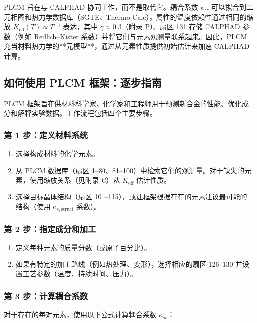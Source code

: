 \documentclass[12pt,a4paper]{article}
\newcommand{\Keff}{K_{\mathrm{eff}}}
\begin{document}
	PLCM 旨在与 CALPHAD 协同工作，而不是取代它。耦合系数 \(\kappa_{sr}\) 可以拟合到二元相图和热力学数据库（SGTE、Thermo-Calc）。属性的温度依赖性通过相同的缩放 \(\Keff(T) \propto T^{-\gamma}\) 表达，其中 \(\gamma \approx 0.3\)（附录 P）。扇区 131 存储 CALPHAD 参数（例如 Redlich–Kister 系数）并将它们与元素观测量联系起来。因此，PLCM 充当材料热力学的**元模型**，通过从元素性质提供初始估计来加速 CALPHAD 计算。
	
	\subsection{如何使用 PLCM 框架：逐步指南}
	
	PLCM 框架旨在供材料科学家、化学家和工程师用于预测新合金的性能、优化成分和解释实验数据。工作流程包括四个主要步骤。
	
	\subsubsection{第 1 步：定义材料系统}
	
	\begin{enumerate}
		\item 选择构成材料的化学元素。
		\item 从 PLCM 数据库（扇区 1–80、81–100）中检索它们的观测量。对于缺失的元素，使用缩放关系（见附录 C）从 \(\Keff\) 估计性质。
		\item 选择目标晶体结构（扇区 101–115），或让框架根据存在的元素建议最可能的结构（使用 \(\kappa_{s,\text{struct}}\) 系数）。
	\end{enumerate}
	
	\subsubsection{第 2 步：指定成分和加工}
	
	\begin{enumerate}
		\item 定义每种元素的质量分数（或原子百分比）。
		\item 如果有特定的加工路线（例如热处理、变形），选择相应的扇区 126–130 并设置工艺参数（温度、持续时间、压力）。
	\end{enumerate}
	
	\subsubsection{第 3 步：计算耦合系数}
	
	对于存在的每对元素，使用以下公式计算耦合系数 \(\kappa_{sr}\)：
	
\end{document}

